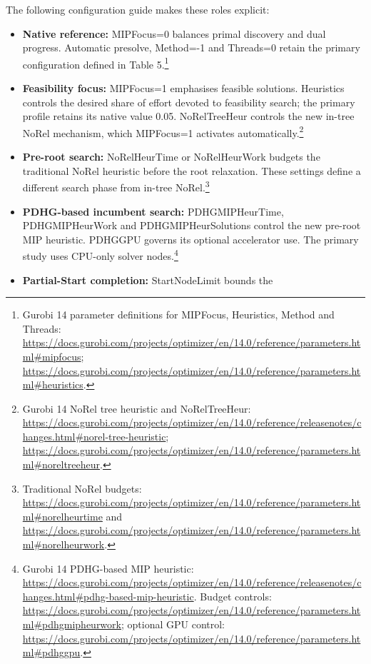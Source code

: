 \documentclass[
  british,
  10pt,
]{article}
\providecommand{\tightlist}{%
  \setlength{\itemsep}{0pt}\setlength{\parskip}{0pt}}
\begin{document}
The following configuration guide makes these roles explicit:

\begin{itemize}
\tightlist
\item
  \textbf{Native reference:} MIPFocus=0 balances primal discovery and
  dual progress. Automatic presolve, Method=-1 and Threads=0 retain the
  primary configuration defined in Table 5.\footnote{Gurobi 14 parameter
    definitions for MIPFocus, Heuristics, Method and Threads:
    \url{https://docs.gurobi.com/projects/optimizer/en/14.0/reference/parameters.html\#mipfocus};
    \url{https://docs.gurobi.com/projects/optimizer/en/14.0/reference/parameters.html\#heuristics}.}
\item
  \textbf{Feasibility focus:} MIPFocus=1 emphasises feasible solutions.
  Heuristics controls the desired share of effort devoted to feasibility
  search; the primary profile retains its native value 0.05.
  NoRelTreeHeur controls the new in-tree NoRel mechanism, which
  MIPFocus=1 activates automatically.\footnote{Gurobi 14 NoRel tree
    heuristic and NoRelTreeHeur:
    \url{https://docs.gurobi.com/projects/optimizer/en/14.0/reference/releasenotes/changes.html\#norel-tree-heuristic};
    \url{https://docs.gurobi.com/projects/optimizer/en/14.0/reference/parameters.html\#noreltreeheur}.}
\item
  \textbf{Pre-root search:} NoRelHeurTime or NoRelHeurWork budgets the
  traditional NoRel heuristic before the root relaxation. These settings
  define a different search phase from in-tree NoRel.\footnote{Traditional
    NoRel budgets:
    \url{https://docs.gurobi.com/projects/optimizer/en/14.0/reference/parameters.html\#norelheurtime}
    and
    \url{https://docs.gurobi.com/projects/optimizer/en/14.0/reference/parameters.html\#norelheurwork}.}
\item
  \textbf{PDHG-based incumbent search:} PDHGMIPHeurTime, PDHGMIPHeurWork
  and PDHGMIPHeurSolutions control the new pre-root MIP heuristic.
  PDHGGPU governs its optional accelerator use. The primary study uses
  CPU-only solver nodes.\footnote{Gurobi 14 PDHG-based MIP heuristic:
    \url{https://docs.gurobi.com/projects/optimizer/en/14.0/reference/releasenotes/changes.html\#pdhg-based-mip-heuristic}.
    Budget controls:
    \url{https://docs.gurobi.com/projects/optimizer/en/14.0/reference/parameters.html\#pdhgmipheurwork};
    optional GPU control:
    \url{https://docs.gurobi.com/projects/optimizer/en/14.0/reference/parameters.html\#pdhggpu}.}
\item
  \textbf{Partial-Start completion:} StartNodeLimit bounds the

\end{itemize}
\end{document}
